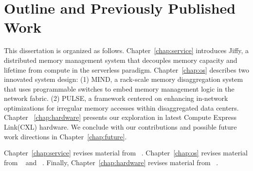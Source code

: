\section{Outline and Previously Published Work}

This dissertation is organized as follows. Chapter~\ref{chap:service} introduces Jiffy, a distributed memory management system that decouples memory capacity and lifetime from compute in the serverless paradigm. Chapter~\ref{chap:os} describes two innovated system design: (1) MIND, a rack-scale memory disaggregation system that uses programmable switches to embed memory management logic in
the network fabric. (2) PULSE, a framework centered on enhancing in-network optimizations for
irregular memory accesses within disaggregated data centers. Chapter ~\ref{chap:hardware} presents our exploration in latest Compute Express Link(CXL) hardware. We conclude with our contributions and possible future work directions in Chapter~\ref{chap:future}.

Chapter~\ref{chap:service} revises material from ~\cite{jiffy}. Chapter~\ref{chap:os} revises material from ~\cite{mind} and ~\cite{chase}. Finally, Chapter~\ref{chap:hardware} revises material from ~\cite{cxleurosys}.
